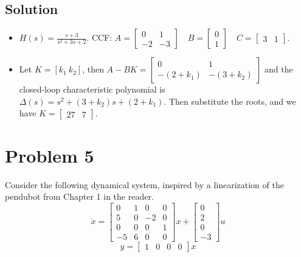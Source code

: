 \documentclass[11pt]{report}
\begin{document}

\subsection*{Solution}
\begin{itemize}
\item $H(s) = \frac{s+3}{s^2+3s+2}$. CCF: $A = \begin{bmatrix} 0 & 1 \\-2 & -3 \end{bmatrix} \quad B = \begin{bmatrix} 0 \\ 1 \end{bmatrix} \quad C = \begin{bmatrix} 3 & 1 \end{bmatrix}$.
\item Let $K = [k_1 ~ k_2]$, then $A - B K = \begin{bmatrix} 0 & 1 \\-(2 + k_1) & -(3 + k_2) \end{bmatrix}$ and the closed-loop characteristic polynomial is $\Delta(s) = s^2 + (3 + k_2)s + (2 + k_1)$. Then substitute the roots, and we have $K = \begin{bmatrix}27 & 7\end{bmatrix}$.
\end{itemize}


\pagebreak
\section*{Problem 5}

Consider the following dynamical system, inspired by a linearization of the pendubot from Chapter 1 in the reader.
\[
\dot x =
\begin{bmatrix}
0 & 1 & 0 & 0 \\
5 & 0 & -2 & 0 \\
0 & 0 & 0 & 1 \\
-5 & 6 & 0 & 0
\end{bmatrix}
x +
\begin{bmatrix}
0 \\
2 \\
0 \\
-3
\end{bmatrix}
u
\]
\[
y =
\begin{bmatrix}
1 & 0 & 0 & 0
\end{bmatrix}
x
\]
\end{document}
